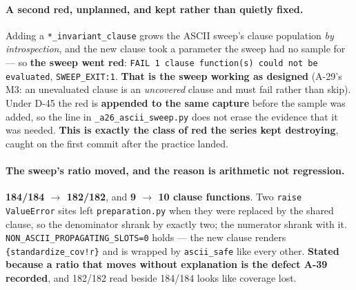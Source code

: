\documentclass[
  10pt,
]{article}
\begin{document}
\paragraph{A second red, unplanned, and kept rather than quietly fixed.}
Adding a \texttt{*\_invariant\_clause} grows the ASCII sweep's clause population \emph{by introspection}, and the new clause took a parameter the sweep had no sample for --- so \textbf{the sweep went red}: \texttt{FAIL 1 clause function(s) could not be evaluated}, \texttt{SWEEP\_EXIT:1}. \textbf{That is the sweep working as designed} (A-29's M3: an unevaluated clause is an \emph{uncovered} clause and must fail rather than skip). Under D-45 the red is \textbf{appended to the same capture} before the sample was added, so the line in \texttt{\_a26\_ascii\_sweep.py} does not erase the evidence that it was needed. \textbf{This is exactly the class of red the series kept destroying}, caught on the first commit after the practice landed.

\paragraph{The sweep's ratio moved, and the reason is arithmetic not regression.}
\textbf{184/184 $\rightarrow$ 182/182}, and \textbf{9 $\rightarrow$ 10 clause functions}. Two \texttt{raise ValueError} sites left \texttt{preparation.py} when they were replaced by the shared clause, so the denominator shrank by exactly two; the numerator shrank with it. \texttt{NON\_ASCII\_PROPAGATING\_SLOTS=0} holds --- the new clause renders \texttt{\{standardize\_cov!r\}} and is wrapped by \texttt{ascii\_safe} like every other. \textbf{Stated because a ratio that moves without explanation is the defect A-39 recorded}, and 182/182 read beside 184/184 looks like coverage lost.
\end{document}
